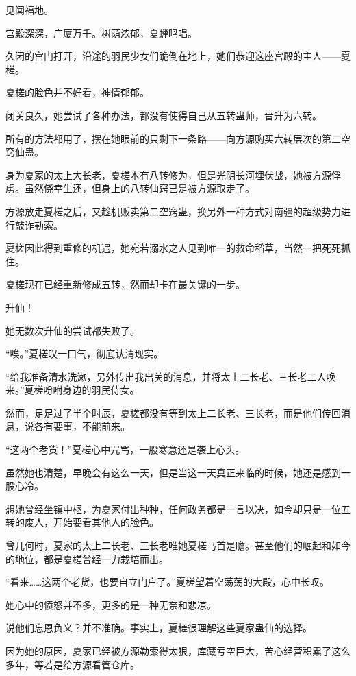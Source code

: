 
\begin{this_body}

见闻福地。

宫殿深深，广厦万千。树荫浓郁，夏蝉鸣唱。

久闭的宫门打开，沿途的羽民少女们跪倒在地上，她们恭迎这座宫殿的主人——夏槎。

夏槎的脸色并不好看，神情郁郁。

闭关良久，她尝试了各种办法，都没有使得自己从五转蛊师，晋升为六转。

所有的方法都用了，摆在她眼前的只剩下一条路——向方源购买六转层次的第二空窍仙蛊。

身为夏家的太上大长老，夏槎本有八转修为，但是光阴长河埋伏战，她被方源俘虏。虽然侥幸生还，但身上的八转仙窍已是被方源取走了。

方源放走夏槎之后，又趁机贩卖第二空窍蛊，换另外一种方式对南疆的超级势力进行敲诈勒索。

夏槎因此得到重修的机遇，她宛若溺水之人见到唯一的救命稻草，当然一把死死抓住。

夏槎现在已经重新修成五转，然而却卡在最关键的一步。

升仙！

她无数次升仙的尝试都失败了。

“唉。”夏槎叹一口气，彻底认清现实。

“给我准备清水洗漱，另外传出我出关的消息，并将太上二长老、三长老二人唤来。”夏槎吩咐身边的羽民侍女。

然而，足足过了半个时辰，夏槎都没有等到太上二长老、三长老，而是他们传回消息，说各有要事，不能前来。

“这两个老货！”夏槎心中咒骂，一股寒意还是袭上心头。

虽然她也清楚，早晚会有这么一天，但是当这一天真正来临的时候，她还是感到一股心冷。

想她曾经坐镇中枢，为夏家付出种种，任何政务都是一言以决，如今却只是一位五转的废人，开始要看其他人的脸色。

曾几何时，夏家的太上二长老、三长老唯她夏槎马首是瞻。甚至他们的崛起和如今的地位，都是夏槎曾经一力栽培而出。

“看来……这两个老货，也要自立门户了。”夏槎望着空荡荡的大殿，心中长叹。

她心中的愤怒并不多，更多的是一种无奈和悲凉。

说他们忘恩负义？并不准确。事实上，夏槎很理解这些夏家蛊仙的选择。

因为她的原因，夏家已经被方源勒索得太狠，库藏亏空巨大，苦心经营积累了这么多年，等若是给方源看管仓库。


\end{this_body}
